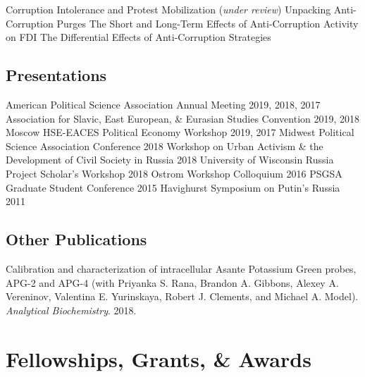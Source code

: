\documentclass[11pt,]{article}
\begin{document}
Corruption Intolerance and Protest Mobilization (\emph{under review})
\hfill \newline Unpacking Anti-Corruption Purges \hfill \newline The
Short and Long-Term Effects of Anti-Corruption Activity on FDI
\hfill \newline The Differential Effects of Anti-Corruption Strategies

\hypertarget{presentations}{%
\subsection{Presentations}\label{presentations}}

American Political Science Association Annual Meeting \hfill 2019, 2018,
2017 \newline Association for Slavic, East European, \& Eurasian Studies
Convention \hfill 2019, 2018 \newline Moscow HSE-EACES Political Economy
Workshop \hfill 2019, 2017 \newline Midwest Political Science
Association Conference \hfill 2018 \newline Workshop on Urban Activism
\& the Development of Civil Society in Russia \hfill 2018 \newline
University of Wisconsin Russia Project Scholar's Workshop \hfill 2018
\newline Ostrom Workshop Colloquium \hfill 2016 \newline PSGSA Graduate
Student Conference \hfill 2015 \newline Havighurst Symposium on Putin's
Russia \hfill 2011

\hypertarget{other-publications}{%
\subsection{Other Publications}\label{other-publications}}

Calibration and characterization of intracellular Asante Potassium Green
probes, APG-2 and APG-4 (with Priyanka S. Rana, Brandon A. Gibbons,
Alexey A. Vereninov, Valentina E. Yurinskaya, Robert J. Clements, and
Michael A. Model). \emph{Analytical Biochemistry}. 2018.

\hypertarget{fellowships-grants-awards}{%
\section{Fellowships, Grants, \&
Awards}\label{fellowships-grants-awards}}
\end{document}
